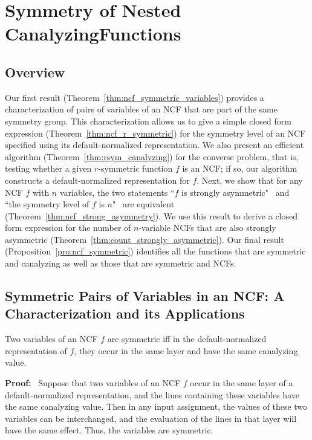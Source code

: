 \section{Symmetry of Nested Canalyzing\newline Functions}
\label{sec:ncf_and_symmetry}

\subsection{Overview}
\label{sse:res_overview}
Our first result (Theorem~\ref{thm:ncf_symmetric_variables})
provides a characterization of pairs of variables of an NCF
that are part of the same symmetry group. 
This characterization allows us to give a simple closed form
expression (Theorem~\ref{thm:ncf_r_symmetric}) 
for the symmetry level of an NCF specified using
its default-normalized representation.
We also present an efficient algorithm (Theorem~\ref{thm:rsym_canalyzing})
for the converse problem, that is,
testing whether a given $r$-symmetric function $f$ is an NCF;
if so, our algorithm constructs a default-normalized 
representation for $f$.
Next, we show that for any NCF $f$ with $n$ variables,
the two statements ``$f$ is strongly asymmetric" ~and~
``the symmetry level of $f$ is $n$"~ are equivalent 
(Theorem~\ref{thm:ncf_strong_asymmetry}).
We use this result to derive a closed form expression 
for the number of $n$-variable NCFs that are 
also strongly asymmetric (Theorem~\ref{thm:count_strongly_asymmetric}).
Our final result (Proposition~\ref{pro:ncf_symmetric})
identifies all the functions that are symmetric and
canalyzing as well as those that are symmetric and NCFs.

\subsection{Symmetric Pairs of Variables in an NCF:\newline 
A Characterization and its Applications}
\label{sse:ncf_strong_sym}

\begin{theorem}\label{thm:ncf_symmetric_variables}
Two variables of an NCF $f$ are symmetric iff
in the default-normalized representation of $f$,
they occur in the same layer and have the same canalyzing value.
\end{theorem}
\noindent
\textbf{Proof:}~
Suppose that two variables of an NCF $f$ occur in the same layer of a
default-normalized representation, and the lines containing these variables
have the same canalyzing value.  Then in any input assignment, the
values of these two variables can be interchanged, and the evaluation
of the lines in that layer will have the same effect.  Thus, the
variables are symmetric.

